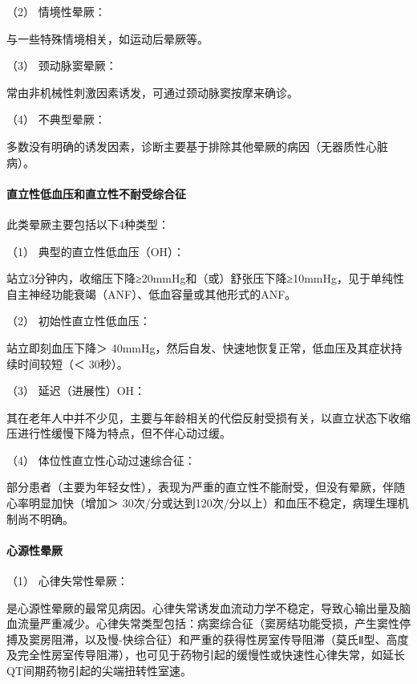 \hypertarget{text00014.htmlux5cux23CHP1-4-1-1-2}{}
（2） 情境性晕厥：

与一些特殊情境相关，如运动后晕厥等。

\hypertarget{text00014.htmlux5cux23CHP1-4-1-1-3}{}
（3） 颈动脉窦晕厥：

常由非机械性刺激因素诱发，可通过颈动脉窦按摩来确诊。

\hypertarget{text00014.htmlux5cux23CHP1-4-1-1-4}{}
（4） 不典型晕厥：

多数没有明确的诱发因素，诊断主要基于排除其他晕厥的病因（无器质性心脏病）。

\paragraph{直立性低血压和直立性不耐受综合征}

此类晕厥主要包括以下4种类型：

\hypertarget{text00014.htmlux5cux23CHP1-4-1-2-1}{}
（1） 典型的直立性低血压（OH）：

站立3分钟内，收缩压下降≥20mmHg和（或）舒张压下降≥10mmHg，见于单纯性自主神经功能衰竭（ANF）、低血容量或其他形式的ANF。

\hypertarget{text00014.htmlux5cux23CHP1-4-1-2-2}{}
（2） 初始性直立性低血压：

站立即刻血压下降＞
40mmHg，然后自发、快速地恢复正常，低血压及其症状持续时间较短（＜
30秒）。

\hypertarget{text00014.htmlux5cux23CHP1-4-1-2-3}{}
（3） 延迟（进展性）OH：

其在老年人中并不少见，主要与年龄相关的代偿反射受损有关，以直立状态下收缩压进行性缓慢下降为特点，但不伴心动过缓。

\hypertarget{text00014.htmlux5cux23CHP1-4-1-2-4}{}
（4） 体位性直立性心动过速综合征：

部分患者（主要为年轻女性），表现为严重的直立性不能耐受，但没有晕厥，伴随心率明显加快（增加＞
30次/分或达到120次/分以上）和血压不稳定，病理生理机制尚不明确。

\paragraph{心源性晕厥}

\hypertarget{text00014.htmlux5cux23CHP1-4-1-3-1}{}
（1） 心律失常性晕厥：

是心源性晕厥的最常见病因。心律失常诱发血流动力学不稳定，导致心输出量及脑血流量严重减少。心律失常类型包括：病窦综合征（窦房结功能受损，产生窦性停搏及窦房阻滞，以及慢-快综合征）和严重的获得性房室传导阻滞（莫氏Ⅱ型、高度及完全性房室传导阻滞），也可见于药物引起的缓慢性或快速性心律失常，如延长QT间期药物引起的尖端扭转性室速。

